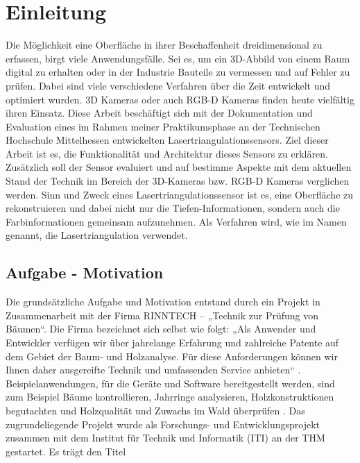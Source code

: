 \section{Einleitung}\label{einleitung}
Die Möglichkeit eine Oberfläche in ihrer Beschaffenheit dreidimensional zu erfassen, birgt viele Anwendungsfälle. Sei es, um ein 3D-Abbild von einem Raum digital zu erhalten oder in der Industrie Bauteile zu vermessen und auf Fehler zu prüfen. Dabei sind viele verschiedene Verfahren über die Zeit entwickelt und optimiert wurden. 3D Kameras oder auch RGB-D Kameras finden heute vielfältig ihren Einsatz. Diese Arbeit beschäftigt sich mit der Dokumentation und Evaluation eines im Rahmen meiner Praktikumsphase an der Technischen Hochschule Mittelhessen entwickelten Lasertriangulationssensors. Ziel dieser Arbeit ist es, die Funktionalität und Architektur dieses Sensors zu erklären. Zusätzlich soll der Sensor evaluiert und auf bestimme Aspekte mit dem aktuellen Stand der Technik im Bereich der 3D-Kameras bzw. RGB-D Kameras verglichen werden.
Sinn und Zweck eines Lasertriangulationssensor ist es, eine Oberfläche zu rekonstruieren und dabei nicht nur die Tiefen-Informationen, sondern auch die Farbinformationen gemeinsam aufzunehmen. Als Verfahren wird, wie im Namen genannt, die Lasertriangulation verwendet.

	\subsection{Aufgabe - Motivation}
	Die grundsätzliche Aufgabe und Motivation entstand durch ein Projekt in Zusammenarbeit mit der Firma RINNTECH – „Technik zur Prüfung von Bäumen“. Die Firma bezeichnet sich selbst wie folgt: „Als Anwender und Entwickler verfügen wir über jahrelange Erfahrung und zahlreiche Patente auf dem Gebiet der Baum- und Holzanalyse. Für diese Anforderungen können wir Ihnen daher ausgereifte Technik und umfassenden Service anbieten“ \citep[vgl.][]{noauthor_rinntech_nodate}. Beispielanwendungen, für die Geräte und Software bereitgestellt werden, sind zum Beispiel Bäume kontrollieren, Jahrringe analysieren, Holzkonstruktionen begutachten und Holzqualität und Zuwachs im Wald überprüfen \citep[vgl.][]{noauthor_rinntech_nodate}. Das zugrundeliegende Projekt wurde als Forschungs- und Entwicklungsprojekt zusammen mit dem Institut für Technik und Informatik (ITI) an der THM gestartet. Es trägt den Titel
	
